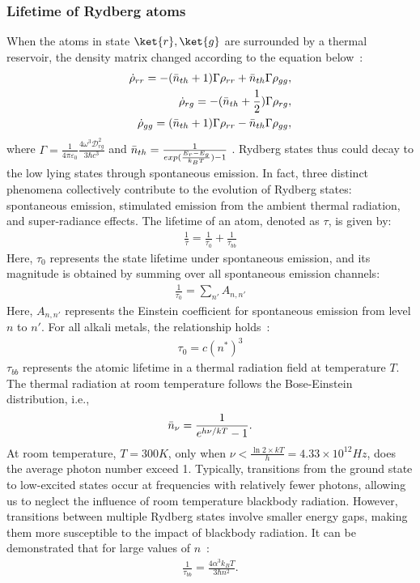 \documentclass[11pt]{article}
\begin{document}
\subsubsection{Lifetime of Rydberg atoms}
When the atoms in state $\ket{r}, \ket{g}$  are surrounded by a thermal reservoir, the density matrix changed according to the equation below~\cite{Quantumoptics}:
\begin{align}
    \dot{\rho}_{rr} = -(\Bar{n}_{th} + 1)\Gamma \rho_{rr} + \Bar{n}_{th}\Gamma \rho_{gg},\\
    \dot{\rho}_{rg} = -(\Bar{n}_{th} + \frac{1}{2})\Gamma \rho_{rg},\\
    \dot{\rho}_{gg} = (\Bar{n}_{th} + 1)\Gamma \rho_{rr} - \Bar{n}_{th}\Gamma \rho_{gg},
\end{align}
where $\Gamma = \frac{1}{4\pi \varepsilon_0} \frac{4\omega^3 \mathcal{D}_{rg}^2}{3\hbar c^3}$ and $\Bar{n}_{th} = \frac{1}{exp(\frac{E_r - E_g}{k_{B} T}) - 1}$ . 
Rydberg states thus could decay to the low lying states through spontaneous emission. In fact, three distinct phenomena collectively contribute to the evolution of Rydberg states: spontaneous emission, stimulated emission from the ambient thermal radiation, and super-radiance effects. The lifetime of an atom, denoted as $\tau$, is given by:
\begin{align}
    \frac{1}{\tau} = \frac{1}{\tau_0} + \frac{1}{\tau_{bb}}
\end{align}
Here, $\tau_0$ represents the state lifetime under spontaneous emission, and its magnitude is obtained by summing over all spontaneous emission channels:
\begin{align}
    \frac{1}{\tau_0} = \sum_{n'} A_{n,n'}
\end{align}
Here, $A_{n,n'}$ represents the Einstein coefficient for spontaneous emission from level $n$ to $n'$. For all alkali metals, the relationship holds~\cite{TFGallagher_1988}:
\begin{align}
    \tau_0  = c(n^*)^3
\end{align}
$\tau_{bb}$ represents the atomic lifetime in a thermal radiation field at temperature $T$. The thermal radiation at room temperature follows the Bose-Einstein distribution, i.e.,
\begin{align}
    \Bar{n}_{\nu} = \frac{1}{ e^{h \nu / kT} - 1}.
\end{align}
At room temperature, $T = 300K$, only when $\nu < \frac{\ln 2 \times k T}{h} = 4.33 \times 10^{12} Hz$, does the average photon number exceed 1. Typically, transitions from the ground state to low-excited states occur at frequencies with relatively fewer photons, allowing us to neglect the influence of room temperature blackbody radiation. However, transitions between multiple Rydberg states involve smaller energy gaps, making them more susceptible to the impact of blackbody radiation. It can be demonstrated that for large values of $n$~\cite{TFGallagher_1988}:
\begin{align}
\frac{1}{\tau_{bb}} = \frac{4\alpha^3k_BT}{3\hbar n^2}.   
\end{align}
  
\end{document}
